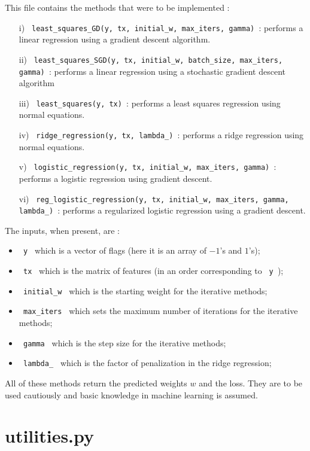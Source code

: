 \documentclass[11pt, oneside]{article}   	%
\begin{document}
This file contains the methods that were to be implemented : 
\begin{itemize}
\item[i)] \lstinline" least_squares_GD(y, tx, initial_w, max_iters, gamma) ": performs a linear regression using a gradient descent algorithm. 
\item[ii)] \lstinline" least_squares_SGD(y, tx, initial_w, batch_size, max_iters, gamma) ": performs a linear regression using a stochastic gradient descent algorithm 

\item[iii)] \lstinline" least_squares(y, tx) ": performs a least squares regression using normal equations.
\item[iv)] \lstinline" ridge_regression(y, tx, lambda_) ": performs a ridge regression using normal equations.
\item[v)] \lstinline" logistic_regression(y, tx, initial_w, max_iters, gamma) ": performs a logistic regression using gradient descent.
\item[vi)] \lstinline" reg_logistic_regression(y, tx, initial_w, max_iters, gamma, lambda_) ": performs a regularized logistic regression using a gradient descent.
\end{itemize}
The inputs, when present, are : 
\begin{itemize}
\item \lstinline" y " which is a vector of flags (here it is an array of $-1$'s and $1$'s); 
\item \lstinline" tx " which is the matrix of features (in an order corresponding to \lstinline" y ");
\item \lstinline" initial_w " which is the starting weight for the iterative methods;
\item \lstinline" max_iters " which sets the maximum number of iterations for the iterative methods;
\item \lstinline" gamma " which is the step size for the iterative methods;
\item \lstinline" lambda_ " which is the factor of penalization in the ridge regression;
\end{itemize}

All of these methods return the predicted weights $w$ and the loss. They are to be used cautiously and basic knowledge in machine learning is assumed.

\section{utilities.py}
\end{document}
